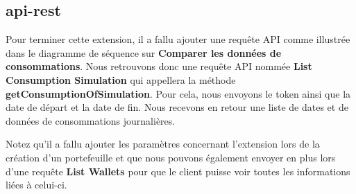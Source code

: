 \subsection{api-rest}

\begin{flushleft}
Pour terminer cette extension, il a fallu ajouter une requête API comme illustrée dans le diagramme de séquence sur \textbf{Comparer les données de consommations}. Nous retrouvons donc une requête API nommée \textbf{List Consumption Simulation} qui appellera la méthode \textbf{getConsumptionOfSimulation}. Pour cela, nous envoyons le token ainsi que la date de départ et la date de fin. Nous recevons en retour une liste de dates et de données de consommations journalières.
\end{flushleft}

\begin{flushleft}
Notez qu'il a fallu ajouter les paramètres concernant l'extension lors de la création d'un portefeuille et que nous pouvons également envoyer en plus lors d'une requête \textbf{List Wallets} pour que le client puisse voir toutes les informations liées à celui-ci.
\end{flushleft}


